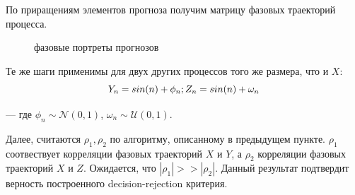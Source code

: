 \documentclass{article}
\begin{document}
   \par По приращениям элементов прогноза получим матрицу фазовых траекторий процесса.
   
  \begin{figure}[t]
\centering 
{}
\caption{фазовые портреты прогнозов}
\label{1}
\end{figure}

   \par Те же шаги применимы для двух других процессов того же размера, что и $X$:
   \begin{equation}
       Y_n = sin(n) + \phi_n; \space Z_n = sin(n) + \omega_n
   \end{equation}
   \par --- где $\phi_n \sim \mathcal{N}(0,1)$, $\omega_n \sim \mathcal{U}(0,1)$.
   \par Далее, считаются $\rho_1,\rho_2$ по алгоритму, описанному в предыдущем пункте. $\rho_1$ соотвествует корреляции фазовых траекторий $X$ и $Y$, а $\rho_2$ корреляции фазовых траекторий $X$ и $Z$. Ожидается, что $|\rho_1| >> |\rho_2|$. Данный результат подтвердит верность построенного decision-rejection критерия. 
\end{document}
